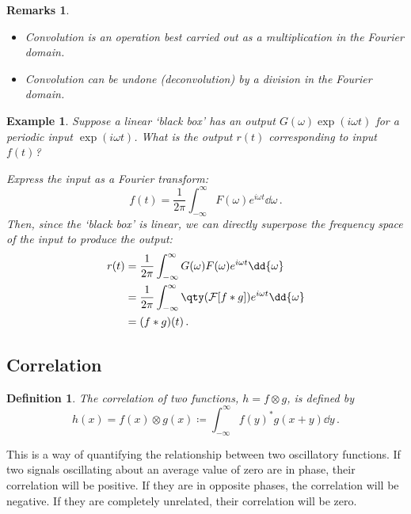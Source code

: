 \documentclass{article}
\theoremstyle{plain}\theoremheaderfont{\normalfont\itshape}\theorembodyfont{\rmfamily}\theoremseparator{.}\newtheorem*{rem}{Remark}\newtheorem*{ex}{Example}\newtheorem*{proof}{Proof}\newtheorem*{altp}{Alternative proof}
\theoremstyle{plain}\theoremheaderfont{\normalfont\bfseries}\theorembodyfont{\rmfamily}\theoremseparator{.}\newtheorem{thm}{Theorem}[section]\newtheorem{lem}[thm]{Lemma}\newtheorem{prop}[thm]{Proposition}\newtheorem*{cor}{Corollary}\newtheorem{defn}[thm]{Definition}\newtheorem{clm}[thm]{Claim}\newtheorem{clminproof}{Claim}
\theoremstyle{break}\theoremheaderfont{\normalfont\itshape}\theorembodyfont{\rmfamily}\theoremseparator{.\medskip}\newtheorem*{proofskip}{Proof}\newtheorem*{exs}{Examples}\newtheorem*{rems}{Remarks}
\theoremstyle{break}\theoremheaderfont{\normalfont\bfseries}\theorembodyfont{\rmfamily}\theoremseparator{.\medskip}\newtheorem{lemskip}[thm]{Lemma}\newtheorem{defnskip}[thm]{Definition}\newtheorem{propskip}[thm]{Proposition}\newtheorem{thmskip}[thm]{Theorem}
\numberwithin{equation}{section}
\begin{document}
	\begin{rems}
		\begin{itemize}[topsep=0pt]
			\item Convolution is an operation best carried out as a multiplication in the Fourier domain.
			\item Convolution can be undone (deconvolution) by a division in the Fourier domain.
		\end{itemize}
	\end{rems}
	
	\begin{ex}
		Suppose a linear `black box' has an output \(G(\omega)\exp(i\omega t)\) for a periodic input \(\exp(i\omega t)\). What is the output \(r(t)\) corresponding to input \(f(t)\)?
	
		Express the input as a Fourier transform:
		\[f(t)=\frac{1}{2\pi}\int_{-\infty}^{\infty}F(\omega)e^{i\omega t}\dd{\omega}\,.\]
		Then, since the `black box' is linear, we can directly superpose the frequency space of the input to produce the output:
		\begin{align*}
			r(t)&=\frac{1}{2\pi}\int_{-\infty}^{\infty}G(\omega)F(\omega)e^{i\omega t}\dd{\omega}\\
			&=\frac{1}{2\pi}\int_{-\infty}^{\infty}\qty(\mathcal{F}[f*g])e^{i\omega t}\dd{\omega}\\
			&=(f*g)(t)\,.
		\end{align*}
	\end{ex}
	
	\subsection{Correlation}
	\begin{defn}
		The \textit{correlation} of two functions, \(h=f\otimes g\), is defined by
		\[h(x)=f(x)\otimes g(x)\coloneqq\int_{-\infty}^{\infty}f(y)^* g(x+y)\dd{y}\,.\]
	\end{defn}
	
	This is a way of quantifying the relationship between two oscillatory functions. If two signals oscillating about an average value of zero are in phase, their correlation will be positive. If they are in opposite phases, the correlation will be negative. If they are completely unrelated, their correlation will be zero.
	
\end{document}
